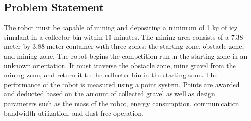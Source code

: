\documentclass[class=article, crop=false]{standalone}
\begin{document}
	\subsection{Problem Statement}
	\label{subsec:problem_statement}
	The robot must be capable of mining and depositing a minimum of 1 kg of icy simulant in a collector bin within 10 minutes. The mining area consists of a 7.38 meter by 3.88 meter container with three zones: the starting zone, obstacle zone, and mining zone. The robot begins the competition run in the starting zone in an unknown orientation. It must traverse the obstacle zone, mine gravel from the mining zone, and return it to the collector bin in the starting zone. The performance of the robot is measured using a point system. Points are awarded and deducted based on the amount of collected gravel as well as design parameters such as the mass of the robot, energy consumption, communication bandwidth utilization, and dust-free operation.

	
\end{document}
